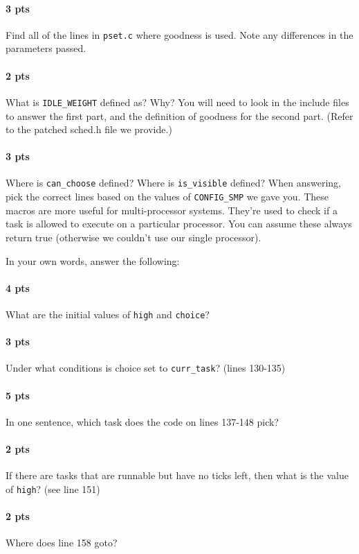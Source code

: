 \documentclass[letterpaper,10pt]{article}
\begin{document}
\paragraph{3 pts} Find all of the lines in \verb=pset.c= where goodness is used. Note any differences
in the parameters passed.
\paragraph{2 pts} What is \verb=IDLE_WEIGHT= defined as? Why? You will need to look in the
include files to answer the first part, and the definition of goodness for the second part.
(Refer to the patched sched.h file we provide.)

\paragraph{3 pts} Where is \verb=can_choose= defined? Where is \verb=is_visible= defined? When
answering, pick the correct lines based on the values of \verb=CONFIG_SMP= we gave you.
These macros are more useful for multi-processor systems. They're used to check if a
task is allowed to execute on a particular processor. You can assume these always
return true (otherwise we couldn't use our single processor).

In your own words, answer the following:
\paragraph{4 pts} What are the initial values of \verb=high= and \verb=choice=?
\paragraph{3 pts} Under what conditions is choice set to \verb=curr_task=? (lines 130-135)
\paragraph{5 pts} In one sentence, which task does the code on lines 137-148 pick?
\paragraph{2 pts} If there are tasks that are runnable but have no ticks left, then what is the
value of \verb=high=? (see line 151)
\paragraph{2 pts} Where does line 158 goto?
\end{document}
